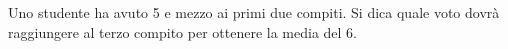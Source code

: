 Uno studente ha avuto 5 e mezzo ai primi due compiti. 
Si dica quale voto dovrà raggiungere al terzo compito 
per ottenere la media del 6.